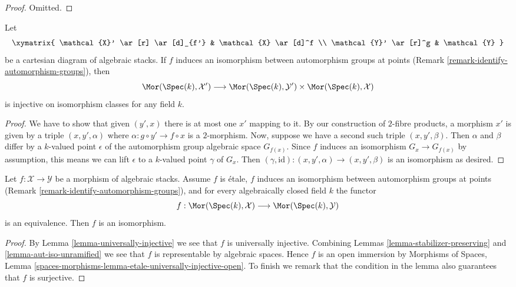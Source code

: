 \begin{proof}
Omitted.
\end{proof}

\begin{lemma}
\label{lemma-stabilizer-preserving-points-cartesian}
Let
$$
\xymatrix{
\mathcal{X}' \ar[r] \ar[d]_{f'} & \mathcal{X} \ar[d]^f \\
\mathcal{Y}' \ar[r]^g & \mathcal{Y}
}
$$
be a cartesian diagram of algebraic stacks. If $f$ induces an isomorphism
between automorphism groups at points
(Remark \ref{remark-identify-automorphism-groups}),
then
$$
\Mor(\Spec(k), \mathcal{X}')
\longrightarrow
\Mor(\Spec(k), \mathcal{Y}') \times \Mor(\Spec(k), \mathcal{X})
$$
is injective on isomorphism classes for any field $k$.
\end{lemma}

\begin{proof}
We have to show that given $(y', x)$ there is at most one $x'$
mapping to it.
By our construction of $2$-fibre products, a morphism
$x'$ is given by a triple $(x, y', \alpha)$
where  $\alpha : g \circ y' \to f \circ x$ is a $2$-morphism.
Now, suppose we have a second such triple $(x, y', \beta)$.
Then $\alpha$ and $\beta$ differ by a $k$-valued point
$\epsilon$ of the automorphism group algebraic space $G_{f(x)}$.
Since $f$ induces an isomorphism $G_x \to G_{f(x)}$ by
assumption, this means we can lift $\epsilon$ to a $k$-valued point
$\gamma$ of $G_x$. Then $(\gamma, \text{id}) : (x, y', \alpha) \to
(x, y', \beta)$ is an isomorphism as desired.
\end{proof}

\begin{lemma}
\label{lemma-etale-iso}
Let $f : \mathcal{X} \to \mathcal{Y}$ be a morphism of algebraic stacks.
Assume $f$ is \'etale, $f$ induces an isomorphism
between automorphism groups at points
(Remark \ref{remark-identify-automorphism-groups}),
and for every algebraically closed field $k$ the functor
$$
f : \Mor(\Spec(k), \mathcal{X}) \longrightarrow \Mor(\Spec(k), \mathcal{Y})
$$
is an equivalence. Then $f$ is an isomorphism.
\end{lemma}

\begin{proof}
By Lemma \ref{lemma-universally-injective} we see that $f$ is
universally injective. Combining
Lemmas \ref{lemma-stabilizer-preserving} and
\ref{lemma-aut-iso-unramified}
we see that $f$ is representable by algebraic spaces.
Hence $f$ is an open immersion by Morphisms of Spaces, Lemma
\ref{spaces-morphisms-lemma-etale-universally-injective-open}.
To finish we remark that the condition in the lemma also guarantees
that $f$ is surjective.
\end{proof}







